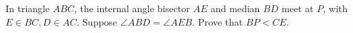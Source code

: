 In triangle $ABC$, the internal angle bisector $AE$ and median $BD$ meet at $P$, with $E\in BC,D\in AC$. Suppose $\angle ABD=\angle AEB$. Prove that $BP<CE$.
